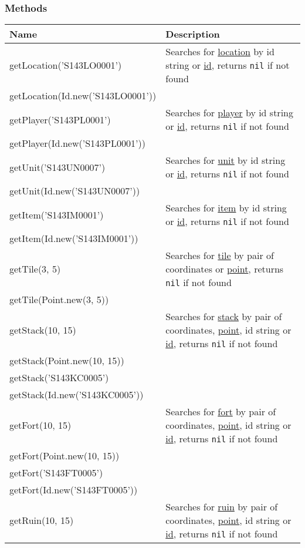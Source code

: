 \subsubsection{Methods}
\begin{center}
\begin{tabularx}{\linewidth}{| l | X |}
\hline
\textbf{Name} & \textbf{Description} \\
\hline
getLocation('S143LO0001') & Searches for \hyperref[Location]{location} by id string or \hyperref[Id]{id}, returns \texttt{nil} if not found\\
getLocation(Id.new('S143LO0001')) & \\
\hline
getPlayer('S143PL0001') & Searches for \hyperref[Player]{player} by id string or \hyperref[Id]{id}, returns \texttt{nil} if not found\\
getPlayer(Id.new('S143PL0001')) & \\
\hline
getUnit('S143UN0007') & Searches for \hyperref[Unit]{unit} by id string or \hyperref[Id]{id}, returns \texttt{nil} if not found\\
getUnit(Id.new('S143UN0007')) & \\
\hline
getItem('S143IM0001') & Searches for \hyperref[Item]{item} by id string or \hyperref[Id]{id}, returns \texttt{nil} if not found\\
getItem(Id.new('S143IM0001')) & \\
\hline
getTile(3, 5) & Searches for \hyperref[Tile]{tile} by pair of coordinates or \hyperref[Point]{point}, returns \texttt{nil} if not found\\
getTile(Point.new(3, 5)) &\\
\hline
getStack(10, 15) & Searches for \hyperref[Stack]{stack} by pair of coordinates, \hyperref[Point]{point}, id string or \hyperref[Id]{id}, returns \texttt{nil} if not found\\
getStack(Point.new(10, 15)) &\\
getStack('S143KC0005') &\\
getStack(Id.new('S143KC0005')) &\\
\hline
getFort(10, 15) & Searches for \hyperref[Fort]{fort} by pair of coordinates, \hyperref[Point]{point}, id string or \hyperref[Id]{id}, returns \texttt{nil} if not found\\
getFort(Point.new(10, 15)) &\\
getFort('S143FT0005') &\\
getFort(Id.new('S143FT0005')) &\\
\hline
getRuin(10, 15) & Searches for \hyperref[Ruin]{ruin} by pair of coordinates, \hyperref[Point]{point}, id string or \hyperref[Id]{id}, returns \texttt{nil} if not found\\

\end{tabularx}
\end{center}
